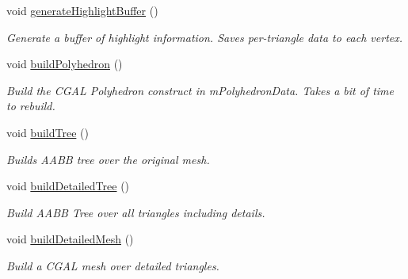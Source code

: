 \begin{DoxyCompactItemize}
\mbox{\label{classpepr3d_1_1_geometry_a36740d72ad8b50c81f39ad506fa0281e}} 
void \mbox{\hyperlink{classpepr3d_1_1_geometry_a36740d72ad8b50c81f39ad506fa0281e}{generate\+Highlight\+Buffer}} ()
\begin{DoxyCompactList}\small\item\em Generate a buffer of highlight information. Saves per-\/triangle data to each vertex. \end{DoxyCompactList}\item 
\mbox{\label{classpepr3d_1_1_geometry_a9ffaaaa3702f7505206f4e45aebfd4a9}} 
void \mbox{\hyperlink{classpepr3d_1_1_geometry_a9ffaaaa3702f7505206f4e45aebfd4a9}{build\+Polyhedron}} ()
\begin{DoxyCompactList}\small\item\em Build the C\+G\+AL Polyhedron construct in m\+Polyhedron\+Data. Takes a bit of time to rebuild. \end{DoxyCompactList}\item 
\mbox{\label{classpepr3d_1_1_geometry_aff6b12b0be4f64925e3a9aa88b85bb09}} 
void \mbox{\hyperlink{classpepr3d_1_1_geometry_aff6b12b0be4f64925e3a9aa88b85bb09}{build\+Tree}} ()
\begin{DoxyCompactList}\small\item\em Builds A\+A\+BB tree over the original mesh. \end{DoxyCompactList}\item 
\mbox{\label{classpepr3d_1_1_geometry_a11091a0db475dc20b6635f17afb07b23}} 
void \mbox{\hyperlink{classpepr3d_1_1_geometry_a11091a0db475dc20b6635f17afb07b23}{build\+Detailed\+Tree}} ()
\begin{DoxyCompactList}\small\item\em Build A\+A\+BB Tree over all triangles including details. \end{DoxyCompactList}\item 
void \mbox{\hyperlink{classpepr3d_1_1_geometry_a5f0594ebe7f3a779dc9cf18f943f1c56}{build\+Detailed\+Mesh}} ()
\begin{DoxyCompactList}\small\item\em Build a C\+G\+AL mesh over detailed triangles. \end{DoxyCompactList}\item 
\mbox{\label{classpepr3d_1_1_geometry_aa981414573779195fbfb7a64cfcbc1f1}} 

\end{DoxyCompactItemize}
